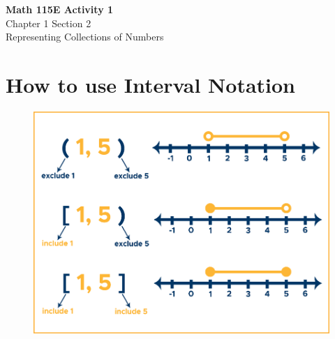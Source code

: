 \documentclass{article}
\begin{document}
\begin{center}
    \Large \textbf{Math 115E Activity 1} \\
    \vspace{0.2cm}
    \normalsize Chapter 1 Section 2 \\
    \normalsize Representing Collections of Numbers
\end{center}
\vspace{1cm} %

\section*{How to use Interval Notation}

\begin{figure}[h!]
    \begin{minipage}{0.48\textwidth}
        \centering
        \includegraphics[scale=0.75]{Interval_chart_8-26.png}
        \label{fig:image1}
    \end{minipage}
    \hfill
    \begin{minipage}{0.48\textwidth}
        \centering

\end{minipage}
\end{figure}
\end{document}
